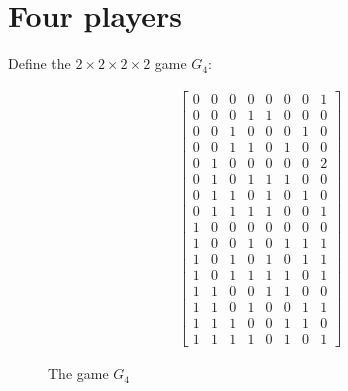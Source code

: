 \documentclass[preprint,12pt,authoryear]{elsarticle}
\begin{document}
\section{Four players}\label{sec:4}

Define the $2\times2\times2\times2$ game $G_4$:
\begin{figure}[H]
\centering
\begin{align*}
  \left[\begin{array}{cccc|cccc}
    0&0&0&0&0&0&0&1\\
    0&0&0&1&1&0&0&0\\
    0&0&1&0&0&0&1&0\\
    0&0&1&1&0&1&0&0\\
    0&1&0&0&0&0&0&2\\
    0&1&0&1&1&1&0&0\\
    0&1&1&0&1&0&1&0\\
    0&1&1&1&1&0&0&1\\
    1&0&0&0&0&0&0&0\\
    1&0&0&1&0&1&1&1\\
    1&0&1&0&1&0&1&1\\
    1&0&1&1&1&1&0&1\\
    1&1&0&0&1&1&0&0\\
    1&1&0&1&0&0&1&1\\
    1&1&1&0&0&1&1&0\\
    1&1&1&1&0&1&0&1
  \end{array}\right]
\end{align*}
\caption{The game $G_4$}
\label{fig:G4}
\end{figure}
\end{document}
